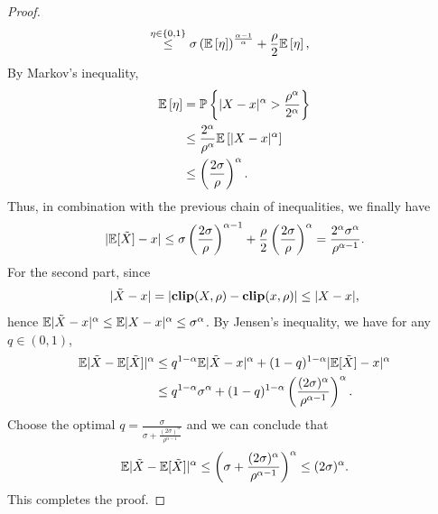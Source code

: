 \documentclass{article} %
\numberwithin{equation}{section}
\begin{document}
\begin{proof}
\begin{equation}
\begin{aligned}
            &\overset{\eta\in\{0,1\}}{\leq} \sigma\left(\mathbb{E}\left[\eta\right]\right)^{\frac{\alpha-1}{\alpha}} + \frac{\rho}{2} \mathbb{E}\left[\eta\right],
        \end{aligned}
    \end{equation}
    By Markov’s inequality,
    \begin{equation}
        \begin{aligned}
            \mathbb{E}\left[\eta\right] 
            &= \mathbb{P}\left\{|X-x|^{\alpha}>\frac{\rho^{\alpha}}{2^{\alpha}}\right\} \\
            &\leq \frac{2^{\alpha}}{\rho^{\alpha}}\mathbb{E}\left[|X-x|^{\alpha}\right]\\
            &\leq \left(\frac{2\sigma}{\rho}\right)^{\alpha}.
        \end{aligned}
    \end{equation}
    Thus, in combination with the previous chain of inequalities, we finally have
    \begin{equation}
        |\mathbb{E}[\Tilde{X}] -x| \leq \sigma \left(\frac{2\sigma}{\rho}\right)^{\alpha-1} + \frac{\rho}{2}\left(\frac{2\sigma}{\rho}\right)^{\alpha} = \frac{2^{\alpha}\sigma^{\alpha}}{\rho^{\alpha-1}}.
    \end{equation}
    For the second part, since
    \begin{equation}
        |\Tilde{X}-x|=|\textbf{clip}(X,\rho)-\textbf{clip}(x,\rho)|\leq |X-x|,
    \end{equation}
    hence $\mathbb{E} |\Tilde{X}-x|^\alpha\leq \mathbb{E} |X-x|^\alpha \leq \sigma^\alpha$.
    By Jensen's inequality, we have for any $q\in (0,1)$,
    \begin{equation}
        \begin{aligned}
            \mathbb{E} |\Tilde{X}-\mathbb{E} [\Tilde{X}]|^\alpha
            &\leq q^{1-\alpha} \mathbb{E}|\Tilde{X}-x|^\alpha + (1-q)^{1-\alpha}|\mathbb{E}[\Tilde{X}]-x|^\alpha \\
            &\leq q^{1-\alpha}\sigma^\alpha + (1-q)^{1-\alpha}\left(\frac{(2\sigma)^\alpha}{\rho^{\alpha-1}}\right)^\alpha.
        \end{aligned}
    \end{equation}
    Choose the optimal $q=\frac{\sigma}{\sigma+\frac{(2\sigma)^\alpha}{\rho^{\alpha-1}}}$ and we can conclude that
    \begin{equation}
        \mathbb{E} |\Tilde{X}-\mathbb{E} [\Tilde{X}]|^\alpha
        \leq \left(\sigma+\frac{(2\sigma)^\alpha}{\rho^{\alpha-1}}\right)^\alpha \leq (2\sigma)^\alpha.
    \end{equation}
    This completes the proof.
\end{proof}
\end{document}
